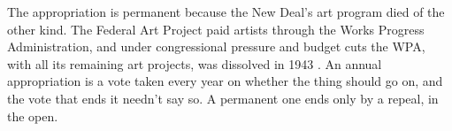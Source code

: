 The appropriation is permanent because the New Deal's art program died of the other kind. The Federal Art Project paid artists through the Works Progress Administration, and under congressional pressure and budget cuts the WPA, with all its remaining art projects, was dissolved in 1943 \autocite{house2025fap}. An annual appropriation is a vote taken every year on whether the thing should go on, and the vote that ends it needn't say so. A permanent one ends only by a repeal, in the open.
